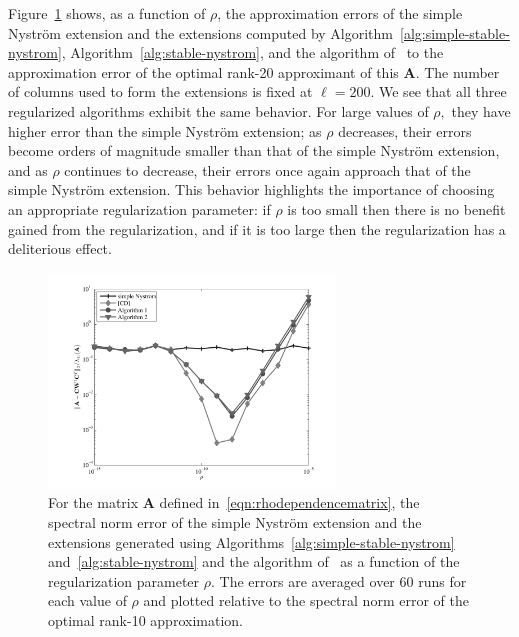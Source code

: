 \documentclass[11pt,letterpaper,twoside,reqno,nosumlimits]{amsart}
\newcommand{\mat}[1]{\ensuremath{\mathbf{#1}}}
\theoremstyle{remark}
\begin{document}
Figure~\ref{fig:regularization} shows, as a function of $\rho$, the approximation errors of the simple Nystr\"om extension and the extensions computed by Algorithm~\ref{alg:simple-stable-nystrom}, Algorithm~\ref{alg:stable-nystrom}, and the algorithm of~\cite{CD11} to the approximation error of the optimal rank-20 approximant of this $\mat{A}$. The number of columns used to form the extensions is fixed at $\ell = 200.$ We see that all three regularized algorithms exhibit the same behavior. For large values of $\rho,$ they have higher error than the simple Nystr\"om extension; as $\rho$ decreases, their errors become orders of magnitude smaller than that of the simple Nystr\"om extension, and as $\rho$ continues to decrease, their errors once again approach that of the simple Nystr\"om extension. This behavior highlights the importance of choosing an appropriate regularization parameter: if $\rho$ is too small then there is no benefit gained from the regularization, and if it is too large then the regularization has a deliterious effect.

\begin{figure}[ht]
 \centering
 \includegraphics[width=3in,keepaspectratio=true]{./experiments/regularizationdependence.pdf}
 \caption{For the matrix $\mat{A}$ defined in~\eqref{eqn:rhodependencematrix}, the spectral norm error of the simple Nystr\"om extension and the extensions generated using Algorithms~\ref{alg:simple-stable-nystrom} and~\ref{alg:stable-nystrom} and the algorithm of~\cite{CD11} as a function of the regularization parameter $\rho.$ The errors are averaged over 60 runs for each value of $\rho$ and plotted relative to the spectral norm error of the optimal rank-10 approximation.}
 \label{fig:regularization}
\end{figure}

\clearpage


\end{document}
